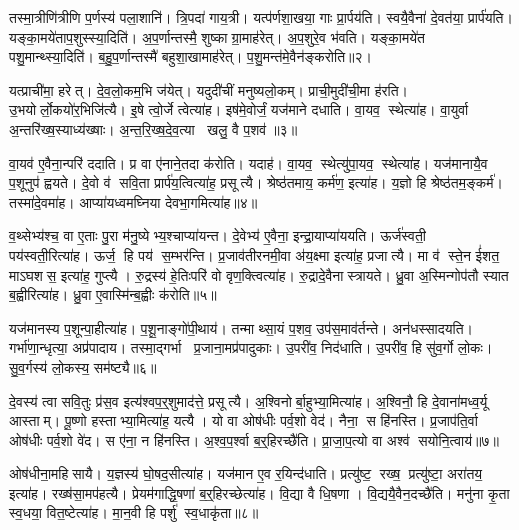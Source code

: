 तस्मा॒त्रीणि॑त्रीणि प॒र्णस्य॑ पला॒शानि॑। त्रि॒पदा॑ गाय॒त्री। यत्प॑र्णशा॒खया॒ गाः प्रा॒र्पय॑ति। स्वयै॒वैना॑ दे॒वत॑या॒ प्रार्प॑यति। यङ्का॒मये॑ताप॒शुस्स्या॒दिति॑। अ॒प॒र्णान्तस्मै॒ शुष्काग्रा॒माह॑रेत्। अ॒प॒शुरे॒व भ॑वति। यङ्का॒मये॑त पशु॒मान्थ्स्या॒दिति॑। ब॒हु॒प॒र्णान्तस्मै॑ बहुशा॒खामाह॑रेत्। प॒शु॒मन्त॑मे॒वैन॑ङ्करोति॥२।

यत्प्राची॑मा॒ हरेत्। दे॒व॒लो॒कम॒भि ज॑येत्। यदुदी॑चीं मनुष्यलो॒कम्। प्राची॒मुदी॑ची॒मा ह॑रति। उ॒भयोर्लो॒कयो॑र॒भिजि॑त्यै। इ॒षे त्वो॒र्जे त्वेत्या॑ह। इष॑मे॒वोर्जं॒ यज॑माने दधाति। वा॒यव॒ स्थेत्या॑ह। वा॒युर्वा अ॒न्तरि॑ख्ष॒स्याध्य॑ख्षाः। अ॒न्त॒रि॒ख्ष॒दे॒व॒त्या खलु॒ वै प॒शव॑॥३॥

वा॒यव॑ ए॒वैना॒न्परि॑ ददाति। प्र वा ए॑नाने॒तदा क॑रोति। यदाह॑। वा॒यव॒ स्थेत्यु॑पा॒यव॒ स्थेत्या॑ह। यज॑मानायै॒व प॒शूनुप॑ ह्वयते। दे॒वो व॑ सवि॒ता प्रार्प॑य॒त्वित्या॑ह॒ प्रसूत्यै। श्रेष्ठ॑तमाय॒ कर्म॑ण॒ इत्या॑ह। य॒ज्ञो हि श्रेष्ठ॑तम॒ङ्कर्म॑। तस्मा॑दे॒वमा॑ह। आप्या॑यध्वमघ्निया देवभा॒गमित्या॑ह॥४॥

व॒थ्सेभ्य॑श्च॒ वा ए॒ताः पु॒रा म॑नु॒ष्येभ्य॒श्चाप्या॑यन्त। दे॒वेभ्य॑ ए॒वैना॒ इन्द्रा॒याप्या॑ययति। ऊर्ज॑स्वती॒ पय॑स्वती॒रित्या॑ह। ऊर्ज॒ हि पय॑ स॒म्भर॑न्ति। प्र॒जाव॑तीरनमी॒वा अ॑य॒क्ष्मा इत्या॑ह॒ प्रजात्यै। मा व॑ स्ते॒न ई॑शत॒ माऽघशस॒ इत्या॑ह॒ गुप्त्यै। रु॒द्रस्य॑ हे॒तिःपरि॑ वो वृण॒क्त्वित्या॑ह। रु॒द्रादे॒वैनास्त्रायते। ध्रु॒वा अ॒स्मिन्गोप॑तौ स्यात ब॒ह्वीरित्या॑ह। ध्रु॒वा ए॒वास्मि॑न्ब॒ह्वीः क॑रोति॥५॥

यज॑मानस्य प॒शून्पा॒हीत्या॑ह। प॒शू॒नाङ्गो॑पी॒थाय॑। तन्माथ्सा॒यं प॒शव॒ उप॑स॒माव॑र्तन्ते। अन॑धस्सादयति। गर्भा॑णा॒न्धृत्या॒ अप्र॑पादाय। तस्मा॒द्गर्भा प्र॒जाना॒मप्र॑पादुकाः। उ॒परी॑व॒ निद॑धाति। उ॒परी॑व॒ हि सु॑व॒र्गो लो॒कः। सु॒व॒र्गस्य॑ लो॒कस्य॒ सम॑ष्ट्यै॥६॥\anuvakamend[प॒शव॑ करोति प॒शवो॑ देवभा॒गमित्या॑ह करोति॒ नव॑ च]

दे॒वस्य॑ त्वा सवि॒तुः प्र॑स॒व इत्य॑श्वप॒र्॒शुमाद॑त्ते॒ प्रसूत्यै। अ॒श्विनोर्बा॒हुभ्या॒मित्या॑ह। अ॒श्विनौ॒ हि दे॒वाना॑मध्व॒र्यू आस्ताम्। पू॒ष्णो हस्ताभ्या॒मित्या॑ह॒ यत्यै। यो वा ओष॑धीः पर्व॒शो वेद॑। नैना॒ स हि॑नस्ति। प्र॒जाप॑ति॒र्वा ओष॑धीः पर्व॒शो वे॑द। स ए॑ना॒ न हि॑नस्ति। अ॒श्व॒प॒र्श्वा ब॒र्॒हिरच्छै॑ति। प्रा॒जा॒प॒त्यो वा अश्व॑ सयोनि॒त्वाय॑॥७॥

ओष॑धीना॒महिसायै। य॒ज्ञस्य॑ घो॒षद॒सीत्या॑ह। यज॑मान ए॒व र॒यिन्द॑धाति। प्रत्यु॑ष्ट॒ रख्ष॒ प्रत्यु॑ष्टा॒ अरा॑तय॒ इत्या॑ह। रख्ष॑सा॒मप॑हत्यै। प्रेयम॑गाद्धि॒षणा॑ ब॒र्॒हिरच्छेत्या॑ह। वि॒द्या वै धि॒षणा। वि॒द्ययै॒वैन॒दच्छै॑ति। मनु॑ना कृ॒ता स्व॒धया॒ वित॒ष्टेत्या॑ह। मा॒न॒वी हि पर्\mbox{}शु॑ स्व॒धाकृ॑ता॥८॥

